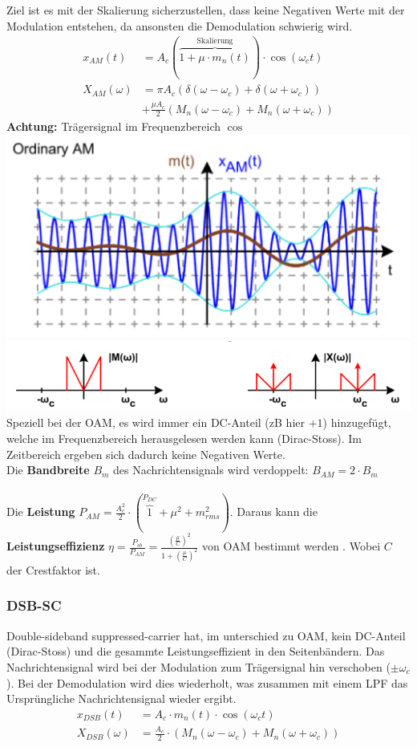 Ziel ist es mit der Skalierung sicherzustellen, dass keine Negativen Werte mit der Modulation entstehen, da ansonsten die Demodulation schwierig wird. 
\begin{align*}
	x_{AM}(t) &= A_c (\overbrace{1 + \mu \cdot m_n(t)}^{\text{Skalierung}})\cdot\cos(\omega_ct) \\
	X_{AM}(\omega) &= \pi A_c (\delta(\omega - \omega_c) + \delta(\omega + \omega_c)) \\
	& + \frac{\mu A_c}{2}(M_n(\omega - \omega_c) + M_n(\omega + \omega_c))
\end{align*}
\noindent\textbf{Achtung:} Trägersignal im Frequenzbereich $\cos$ ~\\

\noindent\includegraphics[width=0.4\columnwidth]{Images/oam} \includegraphics[width=0.6\columnwidth]{Images/oam_f}\\

\noindent Speziell bei der OAM, es wird immer ein DC-Anteil (zB hier $+1$) hinzugefügt, welche im Frequenzbereich herausgelesen werden kann (Dirac-Stoss). Im Zeitbereich ergeben sich dadurch keine Negativen Werte. ~\\

\noindent Die \textbf{Bandbreite} $B_m$ des Nachrichtensignals wird  verdoppelt: $B_{AM} = 2\cdot B_m$\\ ~\\
\noindent Die \textbf{Leistung} $P_{AM} = \frac{A_c^2}{2}\cdot(\overbrace{1}^{P_{DC}} + \mu^2 + m_{rms}^2)$. Daraus kann die \textbf{Leistungseffizienz} $\eta = \frac{P_{sb}}{P_{AM}} = \frac{\left(\frac{\mu}{C}\right)^2}{1+\left(\frac{\mu}{C}\right)^2}$ von OAM bestimmt werden . Wobei $C$ der Crestfaktor ist.

\subsubsection{DSB-SC}
Double-sideband suppressed-carrier hat, im unterschied zu OAM, kein DC-Anteil (Dirac-Stoss) und die gesammte Leistungseffizient in den Seitenbändern. Das Nachrichtensignal wird bei der Modulation zum Trägersignal hin verschoben ($\pm \omega_c$). Bei der Demodulation wird dies wiederholt, was zusammen mit einem LPF das Ursprüngliche Nachrichtensignal wieder ergibt.
\begin{align*}
	x_{DSB}(t) &= A_c \cdot m_n(t)\cdot\cos(\omega_ct) \\
	X_{DSB}(\omega) &= \frac{A_c}{2}\cdot(M_n(\omega - \omega_c) + M_n(\omega + \omega_c))
\end{align*}

